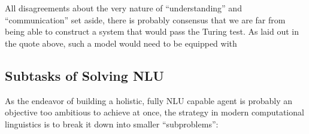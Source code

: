 

All disagreements about the very nature of ``understanding'' and ``communication'' set aside,
there is probably consensus that we are far from being able to construct a system that
would pass the Turing test.
As laid out in the quote above, such a model would need
to be equipped with



\subsection{Subtasks of Solving NLU}

As the endeavor of building a holistic, fully NLU capable agent is probably an objective too
ambitious to achieve at once, the strategy in modern computational linguistics is to break it
down into smaller ``subproblems'':

